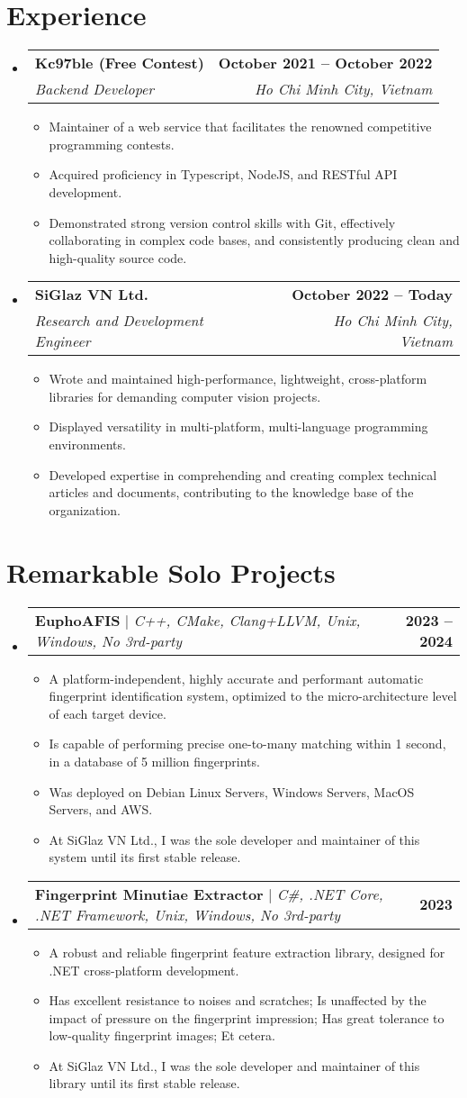 \documentclass[letterpaper,11pt]{article}
\makeatletter
\newcommand{\resumeItem}[1]{
\item\small{
{#1 \vspace{-2pt}}
}
}
\newcommand{\resumeSubheading}[4]{
\vspace{-2pt}\item
\begin{tabular*}{1.0\textwidth}[t]{l@{\extracolsep{\fill}}r}
\textbf{#1} & \textbf{\small #2} \\
\textit{\small#3} & \textit{\small #4} \\
    \end{tabular*}\vspace{-7pt}
}
\newcommand{\resumeProjectHeading}[2]{
\item
\begin{tabular*}{1.001\textwidth}{l@{\extracolsep{\fill}}r}
\small#1 & \textbf{\small #2}\\
\end{tabular*}\vspace{-7pt}
}
\newcommand{\resumeSubHeadingListStart}{\begin{itemize}[leftmargin=0.0in, label={}]}
\newcommand{\resumeSubHeadingListEnd}{\end{itemize}}
\newcommand{\resumeItemListStart}{\begin{itemize}}
\newcommand{\resumeItemListEnd}{\end{itemize}\vspace{-5pt}}
\makeatother
\begin{document}
\section{Experience}
\resumeSubHeadingListStart

\resumeSubheading
{Kc97ble (Free Contest)}{October 2021 -- October 2022}
{Backend Developer}{Ho Chi Minh City, Vietnam}
\resumeItemListStart
\resumeItem{Maintainer of a web service that facilitates the renowned competitive programming contests.}
\resumeItem{Acquired proficiency in Typescript, NodeJS, and RESTful API development.}
\resumeItem{Demonstrated strong version control skills with Git, effectively collaborating in complex code bases, and consistently producing clean and high-quality source code.}
\resumeItemListEnd

\resumeSubheading
{SiGlaz VN Ltd.}{October 2022 -- Today}
{Research and Development Engineer}{Ho Chi Minh City, Vietnam}
\resumeItemListStart
\resumeItem{Wrote and maintained high-performance, lightweight, cross-platform libraries for demanding computer vision projects.}
\resumeItem{Displayed versatility in multi-platform, multi-language programming environments.}
\resumeItem{Developed expertise in comprehending and creating complex technical articles and documents, contributing to the knowledge base of the organization.}
\resumeItemListEnd

\resumeSubHeadingListEnd
\vspace{-16pt}


\section{Remarkable Solo Projects}
\vspace{-5pt}
\resumeSubHeadingListStart
\resumeProjectHeading
{\textbf{EuphoAFIS} $|$ \emph{C++, CMake, Clang+LLVM, Unix, Windows, No 3rd-party}}{2023 -- 2024}
\resumeItemListStart
\resumeItem{A platform-independent, highly accurate and performant automatic fingerprint identification system, optimized to the micro-architecture level of each target device.}
\resumeItem{Is capable of performing precise one-to-many matching within 1 second, in a database of 5 million fingerprints.}
\resumeItem{Was deployed on Debian Linux Servers, Windows Servers, MacOS Servers, and AWS.}
\resumeItem{At SiGlaz VN Ltd., I was the sole developer and maintainer of this system until its first stable release.}
\resumeItemListEnd
\vspace{-13pt}
\resumeProjectHeading
{\textbf{Fingerprint Minutiae Extractor} $|$ \emph{C\#, .NET Core, .NET Framework, Unix, Windows, No 3rd-party}}{2023}
\resumeItemListStart
\resumeItem{A robust and reliable fingerprint feature extraction library, designed for .NET cross-platform development.}
\resumeItem{Has excellent resistance to noises and scratches; Is unaffected by the impact of pressure on the fingerprint impression; Has great tolerance to low-quality fingerprint images; Et cetera.}
\resumeItem{At SiGlaz VN Ltd., I was the sole developer and maintainer of this library until its first stable release.}
\resumeItemListEnd
\resumeSubHeadingListEnd
\vspace{-15pt}
\end{document}
